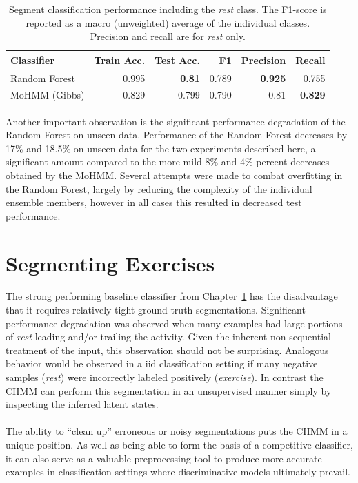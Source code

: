 \documentclass[12pt]{report}
\newcommand{\1}[0]{\mathbbm{1}}
\begin{document}
\begin{table}[ht]
    \centering
    \begin{tabular}{l r r r r r}\hline
    \textbf{Classifier} & \textbf{Train Acc.} & \textbf{Test Acc.} & \textbf{F1}    & \textbf{Precision} & \textbf{Recall} \\\hline
    Random Forest       & 0.995               & \textbf{0.81}      & 0.789          & \textbf{0.925}     & 0.755 \\
    MoHMM (Gibbs)       & 0.829               & 0.799              & 0.790          & 0.81               & \textbf{0.829} \\
    \end{tabular}
    \caption[Performance on the segmented exercise task with \emph{rest}]{
        Segment classification performance including the \emph{rest} class.
        The F1-score is reported as a macro (unweighted) average of the individual classes.
        Precision and recall are for \emph{rest} only.
    }
    \label{table:segment-results-rest}
\end{table}

Another important observation is the significant performance degradation of the Random Forest
on unseen data. Performance of the Random Forest decreases by 17\% and 18.5\% on unseen data
for the two experiments described here, a significant amount compared to the more mild 8\% and 4\%
percent decreases obtained by the \ac{MoHMM}. Several attempts were made to combat overfitting in
the Random Forest, largely by reducing the complexity of the individual ensemble members, however
in all cases this resulted in decreased test performance.


\chapter{Segmenting Exercises}
\label{chap:Segmenting Exercises}
The strong performing baseline classifier from Chapter~\ref{chap:Segmenting Exercises} has the disadvantage
that it requires relatively tight ground truth segmentations. Significant performance degradation
was observed when many examples had large portions of \emph{rest} leading and/or trailing the activity.
Given the inherent non-sequential treatment of the input, this observation should not be surprising.
Analogous behavior would be observed in a \ac{iid} classification setting if many
negative samples (\emph{rest}) were incorrectly labeled positively (\emph{exercise}).
In contrast the \ac{CHMM} can perform this segmentation in an unsupervised manner simply by inspecting the
inferred latent states.
\\\\
The ability to ``clean up'' erroneous or noisy segmentations puts the \ac{CHMM}
in a unique position. As well as being able to form the basis of a competitive classifier,
it can also serve as a valuable preprocessing tool to produce more accurate examples in
classification settings where discriminative models ultimately prevail.
\end{document}
